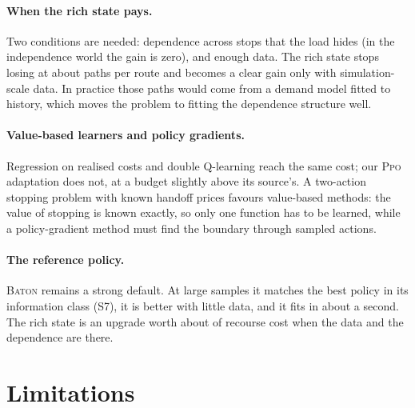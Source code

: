 \documentclass[trsc,dblanonrev]{informs4}
\newcommand{\Baton}{\textsc{Baton}}
\newcommand{\Ppo}{\textsc{Ppo}}
\begin{document}
\paragraph{When the rich state pays.} Two conditions are needed: dependence
across stops that the load hides (in the independence world the gain is zero),
and enough data. The rich state stops losing at about \Crossover{} paths per
route and becomes a clear gain only with simulation-scale data. In practice
those paths would come from a demand model fitted to history, which moves the
problem to fitting the dependence structure well.

\paragraph{Value-based learners and policy gradients.} Regression on realised
costs and double Q-learning reach the same cost; our \Ppo{} adaptation does
not, at a budget slightly above its source's. A two-action stopping problem
with known handoff prices favours value-based methods: the value of stopping is
known exactly, so only one function has to be learned, while a policy-gradient
method must find the boundary through sampled actions.

\paragraph{The reference policy.} \Baton{} remains a strong default. At large
samples it matches the best policy in its information class (S7), it is better
with little data, and it fits in about a second. The rich state is an upgrade
worth about \APrim{} of recourse cost when the data and the dependence are
there.

\section{Limitations}\label{sec:limits}
\end{document}
